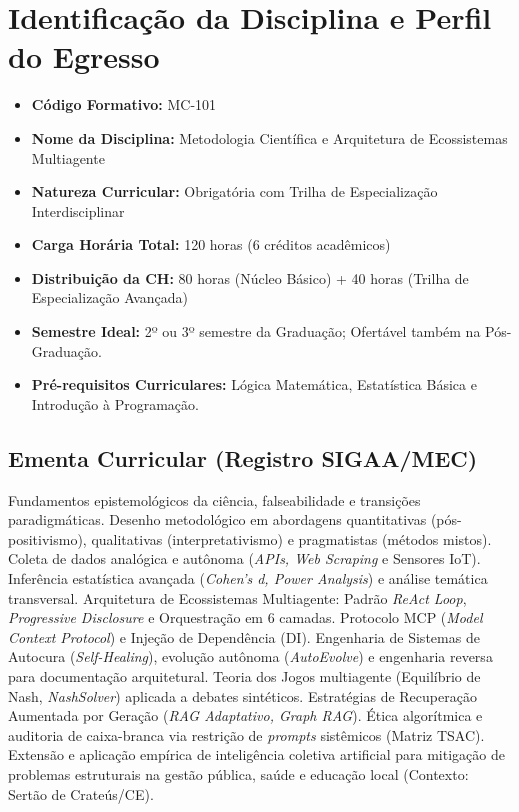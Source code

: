 \documentclass[12pt,a4paper]{article}
\begin{document}
\section{Identificação da Disciplina e Perfil do Egresso}

\begin{tcolorbox}[colback=white,colframe=black,title=\textbf{Quadro 1 - Identificação Institucional da Disciplina}]
\begin{itemize}[leftmargin=*,label=\textbf{-}]
    \item \textbf{Código Formativo:} MC-101
    \item \textbf{Nome da Disciplina:} Metodologia Científica e Arquitetura de Ecossistemas Multiagente
    \item \textbf{Natureza Curricular:} Obrigatória com Trilha de Especialização Interdisciplinar
    \item \textbf{Carga Horária Total:} 120 horas (6 créditos acadêmicos)
    \item \textbf{Distribuição da CH:} 80 horas (Núcleo Básico) + 40 horas (Trilha de Especialização Avançada)
    \item \textbf{Semestre Ideal:} 2º ou 3º semestre da Graduação; Ofertável também na Pós-Graduação.
    \item \textbf{Pré-requisitos Curriculares:} Lógica Matemática, Estatística Básica e Introdução à Programação.
\end{itemize}
\end{tcolorbox}

\subsection{Ementa Curricular (Registro SIGAA/MEC)}
\begin{tcolorbox}[colback=gray!5!white,colframe=black!75!black,title=\textbf{Texto Oficial da Ementa}]
\noindent Fundamentos epistemológicos da ciência, falseabilidade e transições paradigmáticas. Desenho metodológico em abordagens quantitativas (pós-positivismo), qualitativas (interpretativismo) e pragmatistas (métodos mistos). Coleta de dados analógica e autônoma (\textit{APIs, Web Scraping} e Sensores IoT). Inferência estatística avançada (\textit{Cohen's d, Power Analysis}) e análise temática transversal. Arquitetura de Ecossistemas Multiagente: Padrão \textit{ReAct Loop}, \textit{Progressive Disclosure} e Orquestração em 6 camadas. Protocolo MCP (\textit{Model Context Protocol}) e Injeção de Dependência (DI). Engenharia de Sistemas de Autocura (\textit{Self-Healing}), evolução autônoma (\textit{AutoEvolve}) e engenharia reversa para documentação arquitetural. Teoria dos Jogos multiagente (Equilíbrio de Nash, \textit{NashSolver}) aplicada a debates sintéticos. Estratégias de Recuperação Aumentada por Geração (\textit{RAG Adaptativo, Graph RAG}). Ética algorítmica e auditoria de caixa-branca via restrição de \textit{prompts} sistêmicos (Matriz TSAC). Extensão e aplicação empírica de inteligência coletiva artificial para mitigação de problemas estruturais na gestão pública, saúde e educação local (Contexto: Sertão de Crateús/CE).
\end{tcolorbox}
\end{document}
